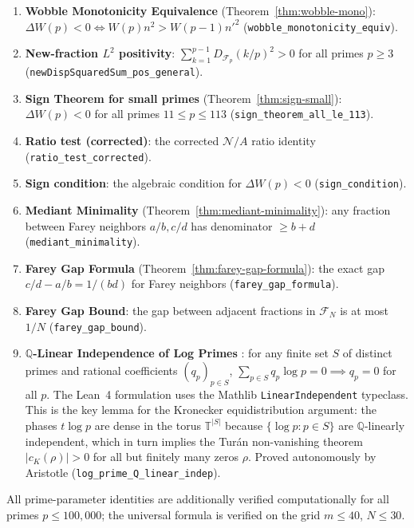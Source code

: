\documentclass[11pt]{article}
\theoremstyle{definition}
\newcommand{\F}{\mathcal{F}}
\begin{document}
\begin{enumerate}
    (\texttt{bPlusC\_eq\_new\_minus\_old\_sq}).
  \item \textbf{Wobble Monotonicity Equivalence}
    (Theorem~\ref{thm:wobble-mono}):
    $\Delta W(p) < 0 \Leftrightarrow W(p) n^2 > W(p-1) {n'}^2$
    (\texttt{wobble\_monotonicity\_equiv}).
  \item \textbf{New-fraction $L^2$ positivity}:
    $\sum_{k=1}^{p-1} D_{\F_p}(k/p)^2 > 0$ for all primes
    $p \ge 3$ (\texttt{newDispSquaredSum\_pos\_general}).
  \item \textbf{Sign Theorem for small primes}
    (Theorem~\ref{thm:sign-small}):
    $\Delta W(p) < 0$ for all primes $11 \le p \le 113$
    (\texttt{sign\_theorem\_all\_le\_113}).
  \item \textbf{Ratio test (corrected)}:
    the corrected $\mathcal{N}/A$ ratio identity
    (\texttt{ratio\_test\_corrected}).
  \item \textbf{Sign condition}:
    the algebraic condition for $\Delta W(p) < 0$
    (\texttt{sign\_condition}).
  \item \textbf{Mediant Minimality}
    (Theorem~\ref{thm:mediant-minimality}):
    any fraction between Farey neighbors $a/b, c/d$ has
    denominator $\ge b + d$
    (\texttt{mediant\_minimality}).
  \item \textbf{Farey Gap Formula}
    (Theorem~\ref{thm:farey-gap-formula}):
    the exact gap $c/d - a/b = 1/(bd)$ for Farey neighbors
    (\texttt{farey\_gap\_formula}).
  \item \textbf{Farey Gap Bound}:
    the gap between adjacent fractions in $\F_N$ is at most
    $1/N$ (\texttt{farey\_gap\_bound}).
  \item \textbf{$\mathbb{Q}$-Linear Independence of Log Primes}
    \label{thm:log-lindep}:
    for any finite set $S$ of distinct primes and rational
    coefficients $(q_p)_{p \in S}$,
    $\sum_{p \in S} q_p \log p = 0 \implies q_p = 0$ for all $p$.
    The Lean~4 formulation uses the Mathlib
    \texttt{LinearIndependent} typeclass.
    This is the key lemma for the Kronecker equidistribution
    argument: the phases $t \log p$ are dense in the torus $\mathbb{T}^{|S|}$
    because $\{\log p : p \in S\}$ are $\mathbb{Q}$-linearly independent,
    which in turn implies the Turán non-vanishing theorem
    $|c_K(\rho)| > 0$ for all but finitely many zeros $\rho$.
    Proved autonomously by Aristotle
    (\texttt{log\_prime\_Q\_linear\_indep}).
\end{enumerate}

\noindent All prime-parameter identities are additionally verified
computationally for all primes $p \le 100{,}000$; the universal
formula is verified on the grid $m \le 40$, $N \le 30$.
\end{document}
